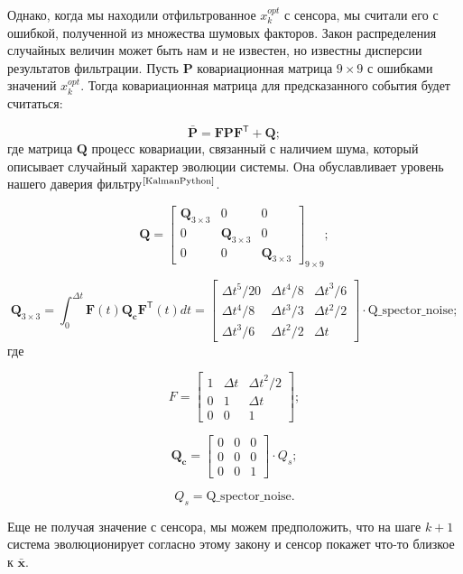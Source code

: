 \documentclass[a4paper,11pt]{article} %
\begin{document}
Однако,  когда мы находили отфильтрованное $x^{opt}_k$ с сенсора,  мы считали его с ошибкой,  полученной из множества шумовых факторов.  Закон распределения случайных величин может быть нам и не известен,  но известны дисперсии результатов фильтрации.  
Пусть $\mathbf P$ ковариационная матрица $9\times9$ с ошибками значений $x^{opt}_k$.  Тогда ковариационная матрица для предсказанного события будет считаться:

\begin{equation}\label{PFQ}
\bar{\mathbf P} = \mathbf{FPF}^\mathsf T + \mathbf Q;
\end{equation}
где матрица $\mathbf Q$ процесс ковариации,  связанный с наличием шума, который описывает случайный характер эволюции системы.  Она обуславливает уровень нашего даверия фильтру$^\text{\cite{KalmanPython}}$.
 
 \begin{equation}\label{Q}
\mathbf Q=\begin{bmatrix}\mathbf Q_{3\times3}&0&0\\0&\mathbf Q_{3\times3}&0\\0&0&\mathbf Q_{3\times3}\end{bmatrix}_{9\times9};
\end{equation}

$$\mathbf Q_{3\times3}= \int_0^{\Delta t} \mathbf F(t)\mathbf{Q_c}\mathbf F^\mathsf{T}(t) dt = 
\begin{bmatrix}\Delta t^5/20 & \Delta t^4/8 & {\Delta t}^3/6 \\ \Delta t^4/8 & \Delta t^3/3 & \Delta t^2/2\\ \Delta t^3/6& \Delta t^2/2& \Delta t\end{bmatrix}
\cdot\text{Q\_spector\_noise};$$
где 

$$F = \begin{bmatrix}1 & \Delta t & {\Delta t}^2/2 \\ 0 & 1 & \Delta t\\ 0& 0& 1\end{bmatrix};$$

$$\mathbf{Q_c} = \begin{bmatrix}0&0&0\\0&0&0\\0&0&1\end{bmatrix} \cdot Q_s;$$

$$Q_s = \text{Q\_spector\_noise.}$$

Еще не получая значение с сенсора,  мы можем предположить, что на шаге $k+1$ система эволюционирует согласно этому закону и сенсор покажет что-то близкое к $\bar{\mathbf x}$.
\end{document}
